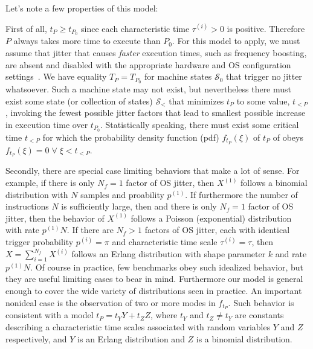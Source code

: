 \documentclass[conference]{IEEEtran}
\begin{document}
Let's note a few properties of this model:

First of all, $t_P \ge t_{P_0}$ since each characteristic time $\tau^{(i)} > 0$ is positive. Therefore $P$ always takes more time to execute than $P_0$.
For this model to apply, we must assume that jitter that causes \textit{faster}
execution times, such as frequency boosting, are absent and disabled with the
appropriate hardware and OS configuration settings~\cite{benchmarktoolschecklist}. We have equality $T_P = T_{P_0}$
for machine states $\mathcal S_0$ that trigger no jitter whatsoever. Such a machine state may not exist, but nevertheless there must exist some state (or collection of states) $\mathcal S_<$ that minimizes $t_P$ to some value, $t_{<P}$, invoking the fewest possible jitter factors that lead to smallest possible increase in execution time over $t_{P_0}$.
Statistically speaking, there must exist some critical time $t_{<P}$ for which the probability density function (pdf) $f_{t_P}(\xi)$ of $t_P$ of obeys $f_{t_P}(\xi) = 0 \; \forall \; \xi < t_{<P}$.

Secondly, there are special case limiting behaviors that make a lot of sense. For example, if there is only $N_f = 1$ factor of OS jitter, then $X^{(1)}$ follows a binomial distribution with $N$ samples and proability $p^{(1)}$. If furthermore the number of instructions $N$ is sufficiently large, then and there is only $N_f = 1$ factor of OS jitter, then the behavior of $X^{(1)}$ follows a Poisson (exponential) distribution with rate $p^{(1)} N$. If there are $N_f > 1$ factors of OS jitter, each with identical trigger probability $p^{(i)} = \pi$ and characteristic time scale $\tau^{(i)} = \tau$, then $X = \sum_{i=1}^{N_f} X^{(i)}$ follows an Erlang distribution with shape parameter $k$ and rate $p^{(1)} N$. Of course in practice, few benchmarks obey such idealized behavior, but they are useful limiting cases to bear in mind. Furthermore our model is general enough to cover the wide variety of distributions seen in practice. An important nonideal case is the observation of two or more modes in $f_{t_P}$. Such behavior is consistent with a model $t_P = t_Y Y + t_Z Z$, where $t_Y$ and $t_Z \ne t_Y$ are constants describing a characteristic time scales associated with random variables $Y$ and $Z$ respectively, and $Y$ is an Erlang distribution and $Z$ is a binomial distribution.


\end{document}
